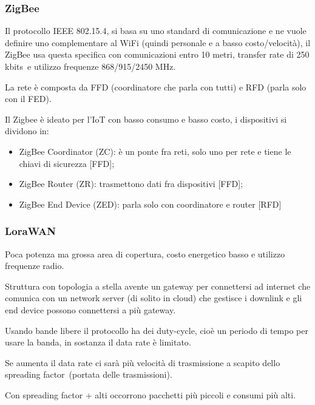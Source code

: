 \documentclass[
]{article}
\providecommand{\tightlist}{%
  \setlength{\itemsep}{0pt}\setlength{\parskip}{0pt}}
\begin{document}
\subsubsection{\texorpdfstring{{ZigBee}}{ZigBee}}\label{h.8f9s7w3xf46t}

{Il protocollo IEEE 802.15.4, si basa su uno standard di comunicazione e
ne vuole definire uno complementare al WiFi (quindi personale e a basso
costo/velocità), il ZigBee usa questa specifica con comunicazioni entro
10 metri, transfer rate di 250 }{kbits}{~e utilizzo frequenze
868/915/2450 MHz.}

{La rete è composta da FFD (coordinatore che parla con tutti) e RFD
(parla solo con il FED).}

{Il Zigbee è ideato per l'IoT con basso consumo e basso costo, i
dispositivi si dividono in:}

\begin{itemize}
\tightlist
\item
  {ZigBee Coordinator (ZC): è un ponte fra reti, solo uno per rete e
  tiene le chiavi di sicurezza {[}FFD{]};}
\item
  {ZigBee Router (ZR): trasmettono dati fra dispositivi {[}FFD{]};}
\item
  {ZigBee End Device (ZED): parla solo con coordinatore e router
  {[}RFD{]}}
\end{itemize}

\subsubsection{\texorpdfstring{{LoraWAN}}{LoraWAN}}\label{h.w2pf0p6s6dp4}

{Poca potenza ma grossa area di copertura, costo energetico basso e
utilizzo frequenze radio.}

{Struttura con topologia a stella avente un gateway per connettersi ad
internet che comunica con un network server (di solito in cloud) che
gestisce i downlink e gli end device possono connettersi a più gateway.}

{Usando bande libere il protocollo ha dei duty-cycle, cioè un periodo di
tempo per usare la banda, in sostanza il data rate è limitato}{. }

{}

{Se aumenta il data rate ci sarà più velocità di trasmissione a scapito
dello spreading factor}{~(portata delle trasmissioni). }

{Con spreading factor + alti occorrono pacchetti più piccoli e consumi
più alti.}
\end{document}
